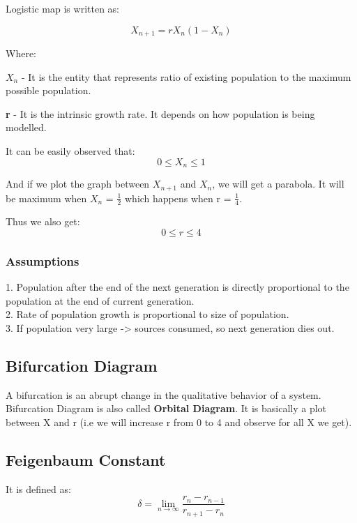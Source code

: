 \documentclass[11pt]{scrartcl} %
\begin{document}
Logistic map is written as:

\begin{equation}
X_{n+1}=r X_{n}\left(1-X_{n}\right)
\end{equation}

Where:\par
\textbf{$X_{n}$} - It is the  entity that represents ratio of existing population to the maximum possible population.\par
\textbf{r} - It is the intrinsic growth rate. It depends on how population is being modelled. \par
 
It can be easily observed that:
\begin{equation*}
0 \leq X_{n} \leq 1
\end{equation*}

And if we plot the graph between $X_{n+1}$ and $X_{n}$, we will get a parabola. It will be maximum when $X_{n}$ = $\frac{1}{2}$ which happens when r = $\frac{1}{4}$.

Thus we also get:
\begin{equation*}
0 \leq r \leq 4
\end{equation*}
 
 
 \subsubsection{Assumptions}
 1. Population after the end of the next generation is directly proportional to the population at the end of current generation.\\
 2. Rate of population growth is proportional to size of population.\\
 3. If population very large -> sources consumed, so next generation dies out.

\subsection{Bifurcation Diagram}
A bifurcation is an abrupt change in the qualitative behavior of a system. Bifurcation Diagram is also called \textbf{Orbital Diagram}. It is basically a plot between X and r (i.e we will increase r from 0 to 4 and observe for all X we get).

\subsection{Feigenbaum Constant}

It is defined as:
\begin{equation}
\delta=\lim _{n \rightarrow \infty} \frac{r_{n}-r_{n-1}}{r_{n+1}-r_{n}}
\end{equation}\par
\end{document}
